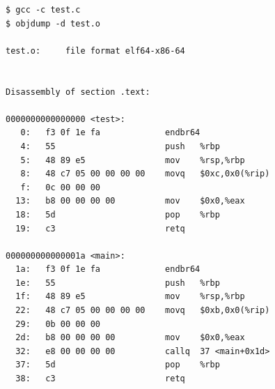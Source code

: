 \begin{verbatim}
$ gcc -c test.c
$ objdump -d test.o

test.o:     file format elf64-x86-64


Disassembly of section .text:

0000000000000000 <test>:                                
   0:   f3 0f 1e fa             endbr64
   4:   55                      push   %rbp
   5:   48 89 e5                mov    %rsp,%rbp
   8:   48 c7 05 00 00 00 00    movq   $0xc,0x0(%rip)   
   f:   0c 00 00 00
  13:   b8 00 00 00 00          mov    $0x0,%eax
  18:   5d                      pop    %rbp
  19:   c3                      retq

000000000000001a <main>:                                
  1a:   f3 0f 1e fa             endbr64
  1e:   55                      push   %rbp
  1f:   48 89 e5                mov    %rsp,%rbp
  22:   48 c7 05 00 00 00 00    movq   $0xb,0x0(%rip)   
  29:   0b 00 00 00
  2d:   b8 00 00 00 00          mov    $0x0,%eax
  32:   e8 00 00 00 00          callq  37 <main+0x1d>   
  37:   5d                      pop    %rbp
  38:   c3                      retq
\end{verbatim}

